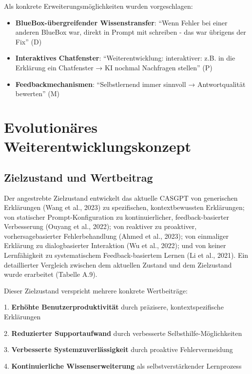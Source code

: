 \documentclass[
  a4paper,
  12pt,
  oneside,
  open=any,
  BCOR=12mm,
  DIV=14,
  parskip=half*,
  headsepline,
  footsepline,
  pointlessnumbers,
  liststotoc,
  numbers=noenddot,
  listof=totoc]{scrartcl}
\providecommand{\tightlist}{%
  \setlength{\itemsep}{0pt}\setlength{\parskip}{0pt}}\usepackage{longtable,booktabs,array}
\begin{document}
Als konkrete Erweiterungsmöglichkeiten wurden vorgeschlagen:

\begin{itemize}
\tightlist
\item
  \textbf{BlueBox-übergreifender Wissenstransfer}: ``Wenn Fehler bei
  einer anderen BlueBox war, direkt in Prompt mit schreiben - das war
  übrigens der Fix'' (D)
\item
  \textbf{Interaktives Chatfenster}: ``Weiterentwicklung: interaktiver:
  z.B. in die Erklärung ein Chatfenster → KI nochmal Nachfragen
  stellen'' (P)
\item
  \textbf{Feedbackmechanismen}: ``Selbstlernend immer sinnvoll →
  Antwortqualität bewerten'' (M)
\end{itemize}

\section{Evolutionäres
Weiterentwicklungskonzept}\label{evolutionuxe4res-weiterentwicklungskonzept}

\subsection{Zielzustand und
Wertbeitrag}\label{zielzustand-und-wertbeitrag}

Der angestrebte Zielzustand entwickelt das aktuelle CASGPT von
generischen Erklärungen (Wang et al., 2023) zu spezifischen,
kontextbewussten Erklärungen; von statischer Prompt-Konfiguration zu
kontinuierlicher, feedback-basierter Verbesserung (Ouyang et al., 2022);
von reaktiver zu proaktiver, vorhersagebasierter Fehlerbehandlung (Ahmed
et al., 2023); von einmaliger Erklärung zu dialogbasierter Interaktion
(Wu et al., 2022); und von keiner Lernfähigkeit zu systematischem
Feedback-basiertem Lernen (Li et al., 2021). Ein detaillierter Vergleich
zwischen dem aktuellen Zustand und dem Zielzustand wurde erarbeitet
(Tabelle A.9).

Dieser Zielzustand verspricht mehrere konkrete Wertbeiträge:

1. \textbf{Erhöhte Benutzerproduktivität} durch präzisere,
kontextspezifische Erklärungen

2. \textbf{Reduzierter Supportaufwand} durch verbesserte
Selbsthilfe-Möglichkeiten

3. \textbf{Verbesserte Systemzuverlässigkeit} durch proaktive
Fehlervermeidung

4. \textbf{Kontinuierliche Wissenserweiterung} als selbstverstärkender
Lernprozess
\end{document}
